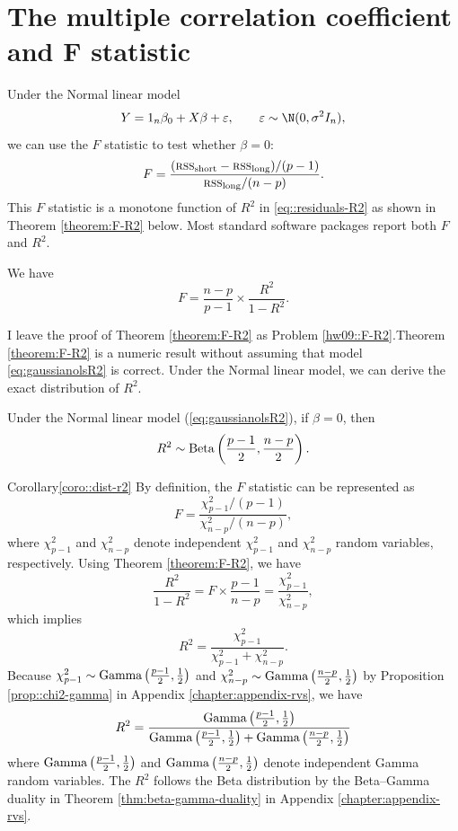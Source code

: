 \section{The multiple correlation coefficient and F statistic}

Under the Normal linear model 
\begin{equation}
Y=1_{n}\beta_0+X \beta +\varepsilon,\qquad\varepsilon\sim\N(0,\sigma^{2}I_{n}),\label{eq:gaussianolsR2}
\end{equation}
we can use the $F$ statistic to test whether $\beta =0$:
$$
F=\frac{(\textsc{rss}_{\text{short}}-\textsc{rss}_{\text{long}})/(p-1)}{\textsc{rss}_{\text{long}}/(n-p)} . 
$$ 
This
$F$ statistic is a monotone function of $R^{2}$ in \eqref{eq::residuals-R2} as shown in Theorem \ref{theorem:F-R2} below. Most standard software
packages report both $F$ and $R^2$.  

\begin{theorem}
\label{theorem:F-R2}We have 
\[
F=\frac{n-p}{p-1}\times\frac{R^{2}}{1-R^{2}}.
\]
\end{theorem}


I leave the proof of Theorem \ref{theorem:F-R2} as Problem \ref{hw09::F-R2}.Theorem \ref{theorem:F-R2} is a numeric result without assuming that model \eqref{eq:gaussianolsR2} is correct. 
Under the Normal linear model, we can derive the exact distribution of $R^2$. 

\begin{corollary}\label{coro::dist-r2}
Under the Normal linear model (\ref{eq:gaussianolsR2}), if $\beta =0$,
then 
\[
R^{2}\sim\textup{Beta}\left(\frac{p-1}{2},\frac{n-p}{2}\right).
\]
\end{corollary}
%
\begin{myproof}{Corollary}{\ref{coro::dist-r2}}
By definition, the $F$ statistic can be represented as 
\[
F=\frac{\chi_{p-1}^{2}/(p-1)}{\chi_{n-p}^{2}/(n-p)} , 
\]
where $\chi_{p-1}^{2}$ and $\chi_{n-p}^{2}$ denote independent $\chi_{p-1}^{2}$ and $\chi_{n-p}^{2}$ random variables, respectively. Using Theorem \ref{theorem:F-R2},
we have
\[
\frac{R^{2}}{1-R^{2}}=F\times\frac{p-1}{n-p}=\frac{\chi_{p-1}^{2}}{\chi_{n-p}^{2}} , 
\]
which implies
\[ 
R^{2}=\frac{\chi_{p-1}^{2}}{\chi_{p-1}^{2}+\chi_{n-p}^{2}}\text{.}
\]
Because $\chi_{p-1}^{2}\sim\textup{Gamma}\left(\frac{p-1}{2},\frac{1}{2}\right)$
and $\chi_{n-p}^{2}\sim\textup{Gamma}\left(\frac{n-p}{2},\frac{1}{2}\right)$ by Proposition \ref{prop::chi2-gamma} in Appendix \ref{chapter:appendix-rvs},
we have
$$
R^{2} 
=\frac{\textup{Gamma}\left(\frac{p-1}{2},\frac{1}{2}\right)}{\textup{Gamma}\left(\frac{p-1}{2},\frac{1}{2}\right)+\textup{Gamma}\left(\frac{n-p}{2},\frac{1}{2}\right)} 
$$
where $\textup{Gamma}\left(\frac{p-1}{2},\frac{1}{2}\right)$ and $\textup{Gamma}\left(\frac{n-p}{2},\frac{1}{2}\right)$ denote independent Gamma random variables. 
The $R^2$ follows the Beta distribution by the Beta--Gamma duality in Theorem \ref{thm:beta-gamma-duality} in Appendix \ref{chapter:appendix-rvs}. 
\end{myproof}
%


